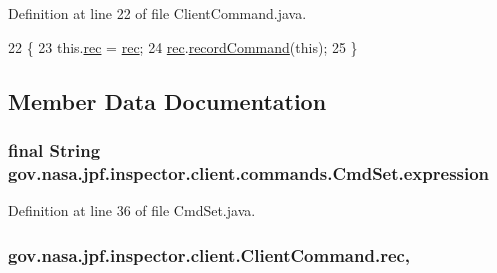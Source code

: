 Definition at line 22 of file Client\+Command.\+java.


\begin{DoxyCode}
22                                                   \{
23     this.\hyperlink{classgov_1_1nasa_1_1jpf_1_1inspector_1_1client_1_1_client_command_af4246f2427035c72a6af45a2c61361f7}{rec} = \hyperlink{classgov_1_1nasa_1_1jpf_1_1inspector_1_1client_1_1_client_command_af4246f2427035c72a6af45a2c61361f7}{rec};
24     \hyperlink{classgov_1_1nasa_1_1jpf_1_1inspector_1_1client_1_1_client_command_af4246f2427035c72a6af45a2c61361f7}{rec}.\hyperlink{classgov_1_1nasa_1_1jpf_1_1inspector_1_1client_1_1_command_recorder_af5f212124179773e46c8b45f1d01a32d}{recordCommand}(\textcolor{keyword}{this});
25   \}
\end{DoxyCode}


\subsection{Member Data Documentation}
\subsubsection[{\texorpdfstring{expression}{expression}}]{\setlength{\rightskip}{0pt plus 5cm}final String gov.\+nasa.\+jpf.\+inspector.\+client.\+commands.\+Cmd\+Set.\+expression\hspace{0.3cm}{\ttfamily [private]}}\hypertarget{classgov_1_1nasa_1_1jpf_1_1inspector_1_1client_1_1commands_1_1_cmd_set_aed86c1fec85487f1a1a4ba772aa260bd}{}\label{classgov_1_1nasa_1_1jpf_1_1inspector_1_1client_1_1commands_1_1_cmd_set_aed86c1fec85487f1a1a4ba772aa260bd}


Definition at line 36 of file Cmd\+Set.\+java.

\subsubsection[{\texorpdfstring{rec}{rec}}]{ gov.\+nasa.\+jpf.\+inspector.\+client.\+Client\+Command.\+rec\hspace{0.3cm}{\ttfamily [protected]}, {\ttfamily [inherited]}}\hypertarget{classgov_1_1nasa_1_1jpf_1_1inspector_1_1client_1_1_client_command_af4246f2427035c72a6af45a2c61361f7}{}\label{classgov_1_1nasa_1_1jpf_1_1inspector_1_1client_1_1_client_command_af4246f2427035c72a6af45a2c61361f7}


